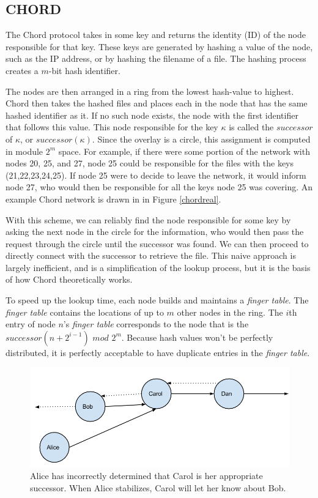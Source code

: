 \documentclass[conference, compsocconf, letterpaper]{IEEEtran}
\begin{document}
\subsection{CHORD}
The Chord protocol \cite{Chord} takes in some key and returns the identity (ID) of the node responsible for that key.  These keys are generated by hashing a value of the node, such as the IP address, or by hashing  the filename of a file.  The hashing process creates a $m$-bit hash identifier.

The nodes are then arranged in a ring from the lowest hash-value to highest.  Chord then takes the hashed files and places each in the node that has the same hashed identifier as it.  If no such node exists, the node with the first identifier that follows this value.  This node responsible for the key $\kappa$ is called the $successor$ of $\kappa$, or $successor(\kappa)$.  Since the overlay is a circle, this assignment is computed in module $2^m$ space.  For example, if there were some portion of the network with nodes 20, 25, and 27, node 25 could be responsible for the files with the keys (21,22,23,24,25). If node 25 were to decide to leave the network, it would inform node 27, who would then be responsible for all the keys node 25 was covering. An example Chord network is drawn in in Figure \ref{chordreal}.

With this scheme, we can reliably find the node responsible for some key by asking the next node in the circle for the information, who would then pass the request through the circle until the successor was found.  We can then proceed to directly connect with the successor to retrieve the file.  This naive approach is largely inefficient, and is a simplification of the lookup process, but it is the basis of how Chord theoretically works.

To speed up the lookup time, each node builds and maintains a \emph{finger table}.  The \emph{finger table} contains the locations of up to $m$ other nodes in the ring.  The $i$th entry of node $n$'s \emph{finger table} corresponds to the node that is the $successor(n+2^{i-1})$ $mod$ $2^m$. Because hash values won't be perfectly distributed, it is perfectly acceptable to have duplicate entries in the \emph{finger table}. 


\begin{figure}
    \includegraphics[width=\linewidth]{abcd1}
    \caption{Alice has incorrectly determined that Carol is her appropriate successor.  When Alice stabilizes, Carol will let her know about Bob.}
    \label{abcd1}
\end{figure}
\end{document}
